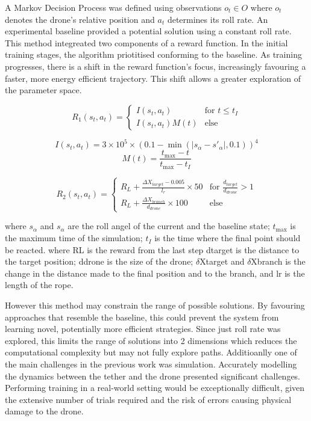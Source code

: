 A Markov Decision Process was defined using observations $o_{t} \in O$ where $o_{t}$ denotes the drone's relative position and $a_{t}$ determines its roll rate.
An experimental baseline provided a potential solution using a constant roll rate.
This method integreated two components of a reward function.
In the initial training stages, the algorithm priotitised conforming to the baseline.
As training progresses, there is a shift in the reward function's focus, increasingly favouring a faster, more energy efficient trajectory.
This shift allows a greater exploration of the parameter space.

\[
R_{1}(s_{t}, a_{t}) = 
\begin{cases} 
I(s_{t}, a_{t}) & \text{for } t \leq t_{I} \\
I(s_{t}, a_{t}) M(t) & \text{else} 
\end{cases}
\]

\[I(s_{t}, a_{t}) = 3 \times 10 ^ 5 \times (0.1 - \min(|s_{\alpha} - s'_{\alpha}|, 0.1)) ^ 4\]
\[M(t) = \frac{t_{\max} - t}{t_{\max} - t_{I}}\]

\[
R_{2}(s_{t}, a_{t}) =
\begin{cases}
  R_{L} + \frac{\Delta X_{target} - 0.005}{l_{r}} \times 50 & \text{for } \frac{d_{target}}{d_{drone}} > 1 \\
  R_{L} + \frac{\Delta X_{branch}}{d_{drone}} \times 100 & \text{else}
\end{cases}
\]

where $s_{\alpha}$ and $s_{\alpha}$ are the roll angel of the current and the baseline state; 
$t_{\max}$ is the maximum time of the simulation; 
$t_{I}$ is the time where the final point should be reacted.
where RL is the reward from the last step dtarget is the distance to the target position; 
ddrone is the size of the drone; 
$\delta$Xtarget and $\delta$Xbranch is the change in the distance made to the final position and to the branch, and lr is the length of the rope.

However this method may constrain the range of possible solutions.
By favouring approaches that resemble the baseline, this could prevent the system from learning novel, potentially more efficient strategies.
Since just roll rate was explored, this limits the range of solutions into 2 dimensions which reduces the computational complexity but may not fully explore paths.
Additioanlly one of the main challenges in the previous work was simulation.
Accurately modelling the dynamics between the tether and the drone presented significant challenges.
Performing training in a real-world setting would be exceptionally difficult, given the extensive number of trials required and the risk of errors causing physical damage to the drone.

